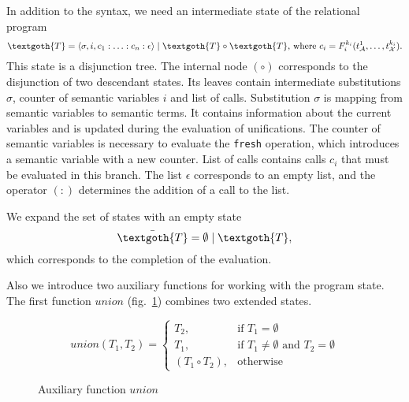 
In addition to the syntax, we need an intermediate state of the relational program
\[
\textgoth{T} = \inbr{\sigma, i, c_1 : \ldots : c_n : \epsilon} \mid \textgoth{T} \circ \textgoth{T} \mbox{, where } c_i = F_i^{k_i}(t_\mathcal{A}^1, \ldots, t_\mathcal{X}^{k_i}).
\]
This state is a disjunction tree. The internal node $(\circ)$ corresponds to the disjunction of two descendant states.
Its leaves contain intermediate substitutions $\sigma$, counter of semantic variables $i$ and list of calls.
Substitution $\sigma$ is mapping from semantic variables to semantic terms.
It contains information about the current variables and is updated during the evaluation of unifications.
The counter of semantic variables is necessary to evaluate the \lstinline{fresh} operation, which introduces a semantic variable with a new counter.
List of calls contains calls $c_i$ that must be evaluated in this branch.
The list $\epsilon$ corresponds to an empty list, and the operator $(:)$ determines the addition of a call to the list.


We expand the set of states with an empty state
\[
\bar{\textgoth{T}} = \emptyset \mid \textgoth{T},
\]
which corresponds to the completion of the evaluation.

Also we introduce two auxiliary functions for working with the program state. The first function $union$ (fig.~\ref{fair:union-semantics}) combines two extended states.

\begin{figure}[h!]
\[
union(T_1, T_2) =
\left\{
\begin{array}{rl}
T_2, & \mbox{if } T_1 = \emptyset \\
T_1, & \mbox{if } T_1 \not= \emptyset \mbox{ and } T_2 = \emptyset \\
(T_1 \circ T_2), & \mbox{otherwise}
\end{array}
\right.
\]
\caption{Auxiliary function $union$}
\label{fair:union-semantics}
\end{figure}

